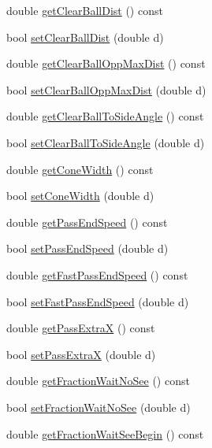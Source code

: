 \begin{DoxyCompactItemize}
\item 
double \hyperlink{classPlayerSettings_a8aec92db959484bc9bb4364795fc08ff}{get\+Clear\+Ball\+Dist} () const 
\item 
bool \hyperlink{classPlayerSettings_a4f37c0ccbfed7bfa98f606d1b2bef022}{set\+Clear\+Ball\+Dist} (double d)
\item 
double \hyperlink{classPlayerSettings_af68da788df9cf34644d67f8aa55184e7}{get\+Clear\+Ball\+Opp\+Max\+Dist} () const 
\item 
bool \hyperlink{classPlayerSettings_a298a05574a863ec353b56cb47d2a67f9}{set\+Clear\+Ball\+Opp\+Max\+Dist} (double d)
\item 
double \hyperlink{classPlayerSettings_a909d44562ad9c2f1142ab0159e3a254f}{get\+Clear\+Ball\+To\+Side\+Angle} () const 
\item 
bool \hyperlink{classPlayerSettings_a102a026bd1761af8e86487fa478ceefc}{set\+Clear\+Ball\+To\+Side\+Angle} (double d)
\item 
double \hyperlink{classPlayerSettings_a2b7c5ff21f229e2c5a96f7206e9d201c}{get\+Cone\+Width} () const 
\item 
bool \hyperlink{classPlayerSettings_a2feb8cf242151163a39379036fbf8620}{set\+Cone\+Width} (double d)
\item 
double \hyperlink{classPlayerSettings_aa235850caad09cfc9b24df0875ebddf0}{get\+Pass\+End\+Speed} () const 
\item 
bool \hyperlink{classPlayerSettings_a88c8d11e365bedd3c0e41f9481f01b41}{set\+Pass\+End\+Speed} (double d)
\item 
double \hyperlink{classPlayerSettings_a40a3ebc661928cd2c96079b2df08b567}{get\+Fast\+Pass\+End\+Speed} () const 
\item 
bool \hyperlink{classPlayerSettings_aef63440c0e432d3c0dd2b9db67453682}{set\+Fast\+Pass\+End\+Speed} (double d)
\item 
double \hyperlink{classPlayerSettings_aa6b33b183254ce9676e53576d6c5612d}{get\+Pass\+ExtraX} () const 
\item 
bool \hyperlink{classPlayerSettings_a96d73a1142897fe589e8061e0ffb530b}{set\+Pass\+ExtraX} (double d)
\item 
double \hyperlink{classPlayerSettings_a104ab0696a9c7c0724af5b7780b1eeec}{get\+Fraction\+Wait\+No\+See} () const 
\item 
bool \hyperlink{classPlayerSettings_a764092fb3ea08f78fbc752fd61077205}{set\+Fraction\+Wait\+No\+See} (double d)
\item 
double \hyperlink{classPlayerSettings_a070019f8a54cd8817040c16431102285}{get\+Fraction\+Wait\+See\+Begin} () const 

\end{DoxyCompactItemize}
